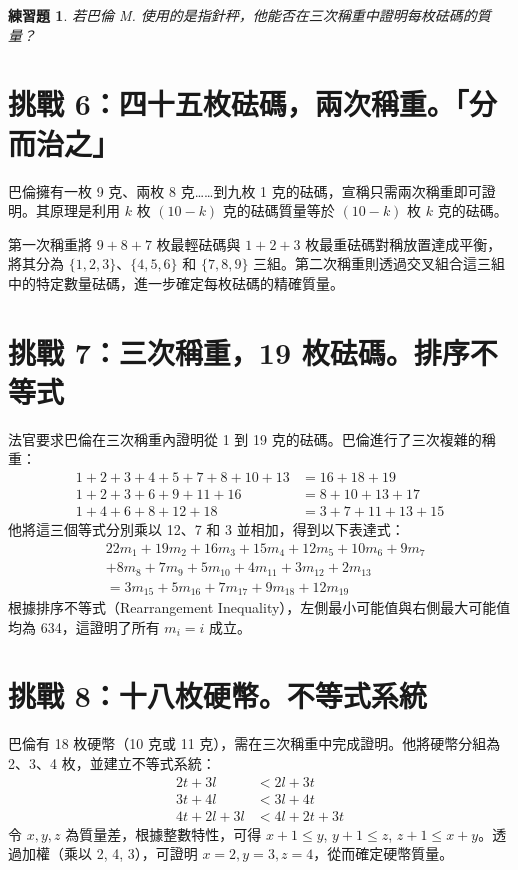 \documentclass[UTF8, a4paper, 12pt]{article}
\newtheorem*{exercise}{練習題}
\begin{document}
\begin{exercise}
若巴倫 M. 使用的是指針秤，他能否在三次稱重中證明每枚砝碼的質量？
\end{exercise}

\section{挑戰 6：四十五枚砝碼，兩次稱重。「分而治之」}
巴倫擁有一枚 9 克、兩枚 8 克……到九枚 1 克的砝碼，宣稱只需兩次稱重即可證明。其原理是利用 $k$ 枚 $(10-k)$ 克的砝碼質量等於 $(10-k)$ 枚 $k$ 克的砝碼。

第一次稱重將 $9+8+7$ 枚最輕砝碼與 $1+2+3$ 枚最重砝碼對稱放置達成平衡，將其分為 $\{1, 2, 3\}$、$\{4, 5, 6\}$ 和 $\{7, 8, 9\}$ 三組。第二次稱重則透過交叉組合這三組中的特定數量砝碼，進一步確定每枚砝碼的精確質量。

\section{挑戰 7：三次稱重，19 枚砝碼。排序不等式}
法官要求巴倫在三次稱重內證明從 1 到 19 克的砝碼。巴倫進行了三次複雜的稱重：
\begin{align*}
    1+2+3+4+5+7+8+10+13 &= 16+18+19 \\
    1+2+3+6+9+11+16 &= 8+10+13+17 \\
    1+4+6+8+12+18 &= 3+7+11+13+15
\end{align*}
他將這三個等式分別乘以 12、7 和 3 並相加，得到以下表達式：
\begin{equation}
\begin{split}
    &22m_{1} + 19m_{2} + 16m_{3} + 15m_{4} + 12m_{5} + 10m_{6} + 9m_{7} \\
    &+ 8m_{8} + 7m_{9} + 5m_{10} + 4m_{11} + 3m_{12} + 2m_{13} \\
    &= 3m_{15} + 5m_{16} + 7m_{17} + 9m_{18} + 12m_{19}
\end{split}
\end{equation}
根據排序不等式（Rearrangement Inequality），左側最小可能值與右側最大可能值均為 634，這證明了所有 $m_{i} = i$ 成立。

\section{挑戰 8：十八枚硬幣。不等式系統}
巴倫有 18 枚硬幣（10 克或 11 克），需在三次稱重中完成證明。他將硬幣分組為 2、3、4 枚，並建立不等式系統：
\begin{align*}
    2t + 3l &< 2l + 3t \\
    3t + 4l &< 3l + 4t \\
    4t + 2l + 3l &< 4l + 2t + 3t
\end{align*}
令 $x, y, z$ 為質量差，根據整數特性，可得 $x+1 \le y$, $y+1 \le z$, $z+1 \le x+y$。透過加權（乘以 2, 4, 3），可證明 $x=2, y=3, z=4$，從而確定硬幣質量。
\end{document}
